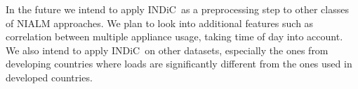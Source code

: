 \documentclass[conference]{IEEEtran}
\newcommand{\indic}{INDiC~}
\begin{document}
\noindent In the future we intend to apply \indic as a preprocessing step to other classes of NIALM approaches. We plan to look into additional features such as correlation between multiple appliance usage, taking time of day into account. We also intend to apply \indic on other datasets, especially the ones from developing countries where loads are significantly different from the ones used in developed countries.




\end{document}
